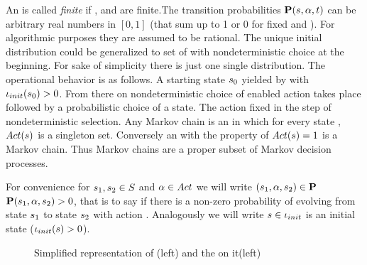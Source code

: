 \documentclass[preview]{standalone}
\begin{document}
An \mdpN is called \emph{finite} if \states, \actions and \atomicprops are finite.The transition probabilities ${\textbf{P}}({s}, {\alpha}, t)$ can be arbitrary real numbers in $[0,1]$ (that sum up to 1 or 0 for fixed \state and \action). For algorithmic purposes they are assumed to be rational. The unique initial distribution \initdistrib could be generalized to set of \initdistrib with nondeterministic choice at the beginning. For sake of simplicity there is just one single distribution. The operational behavior is as follows. A starting state ${s}_0$ yielded by \initdistrib with ${\iota_{init}}({s}_0) > 0$. From there on nondeterministic choice of enabled action takes place followed by a probabilistic choice of a state. The action fixed in the step of nondeterministic selection. Any Markov chain is an \mdpN in which for every state \state, ${Act}({s})$ is a singleton set. Conversely an \mdpN with the property of ${Act}({s}) = 1$ is a Markov chain. Thus Markov chains are a proper subset of Markov decision processes.

For convenience for ${s}_1, {s}_2 \in {S}$ and ${\alpha} \in {Act}$ we will write $({s}_1, {\alpha}, {s}_2) \in {\textbf{P}}$ \iffN ${\textbf{P}}({s}_1, {\alpha}, {s}_2) > 0$, that is to say if there is a non-zero probability of evolving from state ${s}_1$ to state ${s}_2$ with action \action. Analogously we will write ${s} \in {\iota_{init}}$ \iffN is an initial state (${\iota_{init}}({s}) > 0$).



\begin{figure}[h]
	
	\caption{Simplified representation of \mdp (left) and the \viewN \viewinitstates on it(left)}
	\label{fig:exampleMdp}  
\end{figure}
\end{document}
